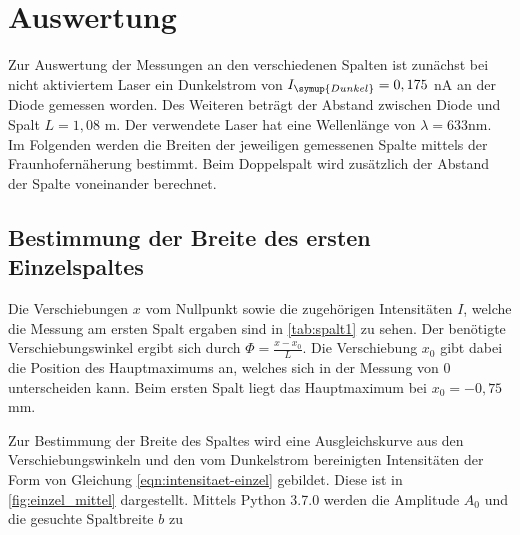 \section{Auswertung}
\label{sec:Auswertung}
Zur Auswertung der Messungen an den verschiedenen Spalten ist zunächst bei nicht aktiviertem Laser ein Dunkelstrom von
$I_{\symup{Dunkel}} = 0,175$ nA an der Diode gemessen worden.
Des Weiteren beträgt der Abstand zwischen Diode und Spalt $L = 1,08$ m. Der verwendete Laser hat eine Wellenlänge von $\lambda = 633$nm.
Im Folgenden werden die Breiten der jeweiligen gemessenen Spalte mittels der Fraunhofernäherung bestimmt. Beim Doppelspalt wird zusätzlich
der Abstand der Spalte voneinander berechnet.
\subsection{Bestimmung der Breite des ersten Einzelspaltes}
    Die Verschiebungen $x$ vom Nullpunkt sowie die zugehörigen Intensitäten $I$, welche die Messung am ersten Spalt ergaben sind in \autoref{tab:spalt1}
    zu sehen. Der benötigte Verschiebungswinkel ergibt sich durch $\Phi = \frac{x -x_0}{L}$. Die Verschiebung $x_0$ gibt dabei die 
    Position des Hauptmaximums an, welches sich in der Messung von $0$ unterscheiden kann. Beim ersten Spalt liegt das Hauptmaximum bei 
    $x_0 = - 0,75$ mm.
    
    Zur Bestimmung der Breite des Spaltes wird eine Ausgleichskurve aus den Verschiebungswinkeln und den vom Dunkelstrom bereinigten
    Intensitäten der Form von Gleichung \eqref{eqn:intensitaet-einzel} gebildet. 
    Diese ist in \autoref{fig:einzel_mittel} dargestellt. Mittels Python 3.7.0 werden die Amplitude $A_0$ und die gesuchte Spaltbreite $b$ zu 
    
